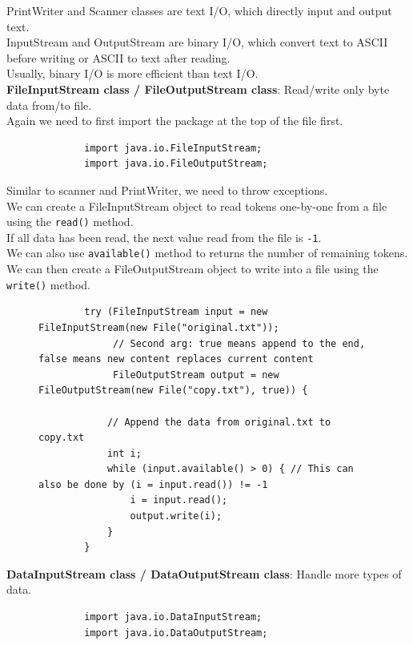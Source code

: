 \documentclass{article}
\begin{document}
PrintWriter and Scanner classes are text I/O, which directly input and output text.\\
InputStream and OutputStream are binary I/O, which convert text to ASCII before writing or ASCII to text after reading.\\
Usually, binary I/O is more efficient than text I/O.\\
\textbf{FileInputStream class / FileOutputStream class}: Read/write only byte data from/to file.\\
Again we need to first import the package at the top of the file first.

\begin{figure}[h]
	\begin{verbatim}
		import java.io.FileInputStream;
		import java.io.FileOutputStream;
	\end{verbatim}
\end{figure}

Similar to scanner and PrintWriter, we need to throw exceptions.\\
We can create a FileInputStream object to read tokens one-by-one from a file using the \texttt{read()} method.\\
If all data has been read, the next value read from the file is \texttt{-1}.\\
We can also use \texttt{available()} method to returns the number of remaining tokens.\\
We can then create a FileOutputStream object to write into a file using the \texttt{write()} method.
\begin{figure}[h]
	\begin{verbatim}
		try (FileInputStream input = new FileInputStream(new File("original.txt"));
		     // Second arg: true means append to the end, false means new content replaces current content
		     FileOutputStream output = new FileOutputStream(new File("copy.txt"), true)) {     
		    
		    // Append the data from original.txt to copy.txt
		    int i;
		    while (input.available() > 0) { // This can also be done by (i = input.read()) != -1
		        i = input.read();
		        output.write(i);
		    }
		}
	\end{verbatim}
\end{figure}
\newpage

\textbf{DataInputStream class / DataOutputStream class}: Handle more types of data.

\begin{figure}[h]
	\begin{verbatim}
		import java.io.DataInputStream;
		import java.io.DataOutputStream;
	\end{verbatim}
\end{figure}
\end{document}
